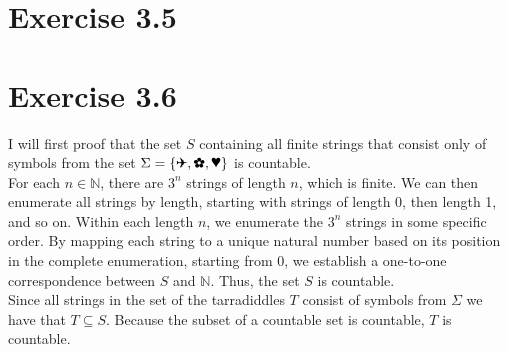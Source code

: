 \documentclass{article} %
\newcommand{\homeworkNumber}{3}
\newcommand{\plane}{\text{\ding{40}}}
\newcommand{\heart}{\text{\ding{95}}}
\newcommand{\flower}{\text{\ding{170}}}
\begin{document}
\section*{Exercise \homeworkNumber.5}


\section*{Exercise \homeworkNumber.6}
I will first proof that the set \( S \) containing all finite strings that consist
only of symbols from the set \(  \Sigma = \left\{ \plane, \heart, \flower \right\}  \) is countable. \\
For each \( n \in \mathbb{N} \), there are \( 3^n \) strings of length \( n \), which is finite.
We can then enumerate all strings by length, starting with strings of length 0, then length 1, and so on.
Within each length \( n \), we enumerate the \( 3^n \) strings in some specific order.
By mapping each string to a unique natural number based on its position in the complete enumeration, starting from 0, we establish a one-to-one correspondence between \( S \) and \( \mathbb{N} \).
Thus, the set \( S \) is countable. \\
Since all strings in the set of the tarradiddles \( T \) consist of symbols from \( \Sigma \) we have that \( T \subseteq S \). Because the subset of a countable set is countable, \( T \) is countable.
\end{document}
